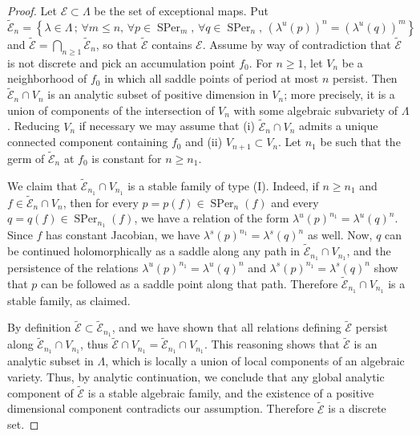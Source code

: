 \documentclass[10pt,a4paper]{amsart}
\DeclareMathOperator{\SPer}{SPer}
\newcommand{\set}[1]{\left\{#1\right\}}
\begin{document}
\begin{proof}
Let $\mathcal E\subset \Lambda$ be the set of exceptional maps. Put 
$$\widetilde {\mathcal E}_n = \set{\lambda\in \Lambda\, ; \,  \forall m\leq n, \, \forall p\in  \SPer_m, \, 
\forall q\in  \SPer_n, \, (\lambda^u(p))^n = (\lambda^u(q))^m} $$
and $\widetilde {\mathcal E}= \bigcap_{n\geq 1}\widetilde {\mathcal E}_n$,  
so that $\widetilde {\mathcal E}$ contains $\mathcal E$. Assume by way of contradiction that 
$\widetilde {\mathcal E}$ is not discrete and pick an accumulation point 
$f_0$. For  $n\geq 1$, let $V_n$ be a neighborhood of $f_0$ in which all saddle points of period at most $n$ persist.  
Then $\widetilde {\mathcal E}_n\cap V_n$ is an analytic subset of positive dimension
 in $V_n$; more precisely, it is a 
  union of components of the intersection of $V_n$ with some algebraic subvariety of $\Lambda$.  Reducing $V_n$ if necessary we may assume that (i) $\widetilde {\mathcal E}_n\cap V_n$ admits a unique connected component containing $f_0$ and (ii)  $V_{n+1}\subset V_n$. Let $n_1$ be such that the germ of 
   $\widetilde {\mathcal E}_n$ at $f_0$ is constant for $n\geq n_1$. 
   
We claim that  $\widetilde {\mathcal E}_{n_1}\cap V_{n_1}$ is a stable family of type (I).  Indeed,  if 
$n\geq n_1$ and $f\in \widetilde {\mathcal E}_n\cap V_n$, then 
for every $p = p(f)\in \SPer_n(f)$ and every $q= q(f)\in \SPer_{n_1}(f)$, we have a 
relation of the form $\lambda^u(p)^{n_1} = \lambda^u(q)^n$. Since $f$ has constant Jacobian, we have $\lambda^s(p)^{n_1} = \lambda^s(q)^n$ as well. 
Now, $q$ can be 
continued  holomorphically as a saddle along  any path in
$\widetilde {\mathcal E}_{n_1}\cap V_{n_1}$, and  
the persistence of the relations $\lambda^u(p)^{n_1} = \lambda^u(q)^n$ and 
$\lambda^s(p)^{n_1} = \lambda^s(q)^n$ show that $p$ can be followed 
as a saddle point along that path. Therefore $\widetilde {\mathcal E}_{n_1}\cap V_{n_1}$ is 
a stable family, as claimed. 

By definition $\widetilde {\mathcal E} \subset \widetilde {\mathcal E}_{n_1}$, 
and we have shown that all relations defining $\widetilde {\mathcal E}$ persist along $\widetilde {\mathcal E}_{n_1}\cap V_{n_1}$, 
thus $\widetilde {\mathcal E} \cap V_{n_1} =\widetilde {\mathcal E}_{n_1}\cap V_{n_1}$.
This reasoning shows that $\widetilde {\mathcal E}$ is an analytic subset in $\Lambda$, which 
is locally a union of local components of an algebraic variety. Thus, by analytic continuation, we conclude that any global analytic component of $\widetilde {\mathcal E}$ is a 
stable algebraic family, and the existence of a positive dimensional component contradicts our assumption. Therefore $\widetilde {\mathcal E}$ is a discrete set.
\end{proof}
\end{document}
